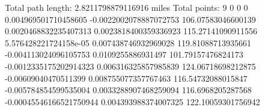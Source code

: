 Total path length: 2.8211798879116916 miles
Total points: 9
0 0 0
0.004969501710458605 -0.0022002078887072753 106.07583046600139
0.0020468832235407313 0.0023818400359336923 115.27141090911556
5.576428221724158e-05 0.007438746932969028 119.81088713935661
-0.004113024096105753 0.0109255886931497 101.79157476824173
-0.0012335175202914323 0.006316325857985839 124.06718698212875
-0.00609040470511399 0.008755077357767463 116.54732088015847
-0.005784854599535004 0.0033288907468259094 116.6968205287568
-0.00045546166521750944 0.004393988374007325 122.10059301756942
